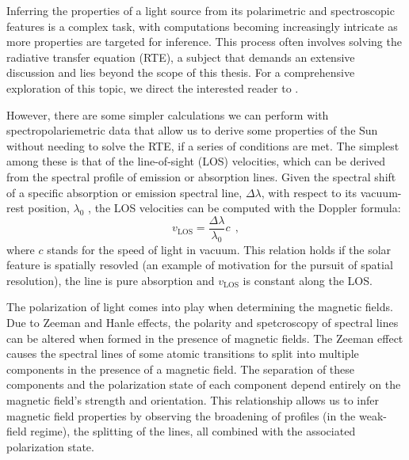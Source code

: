 Inferring the properties of a light source from its polarimetric and spectroscopic features is a complex task, with computations becoming increasingly intricate as more properties are targeted for inference. This process often involves solving the radiative transfer equation (RTE), a subject that demands an extensive discussion and lies beyond the scope of this thesis. For a comprehensive exploration of this topic, we direct the interested reader to \cite{del2016inversion}.

However, there are some simpler calculations we can perform with spectropolariemetric data that allow us to derive some properties of the Sun without needing to solve the RTE, if a series of conditions are met. The simplest among these is that of the line-of-sight (LOS) velocities, which can be derived from the spectral profile of emission or absorption lines. Given the spectral shift of a specific absorption or emission spectral line, $\Delta \lambda$, with respect to its vacuum-rest position, $\lambda _ 0$ , the LOS velocities can be computed with the Doppler formula: 
\begin{equation}
  v_{\text{LOS}} = \frac{\Delta \lambda}{\lambda _ 0}c\ \ ,
  \label{eq_spectro: Doppler}
\end{equation}
where $c$ stands for the speed of light in vacuum. This relation holds if the solar feature is spatially resovled (an example of motivation for the pursuit of spatial resolution), the line is pure absorption and $v_{\text{LOS}}$ is constant along the LOS. 

The polarization of light comes into play when determining the magnetic fields. Due to Zeeman and Hanle effects, the polarity and spetcroscopy of spectral lines can be altered when formed in the presence of magnetic fields. The Zeeman effect causes the spectral lines of some atomic transitions to split into multiple components in the presence of a magnetic field. The separation of these components and the polarization state of each component depend entirely on the magnetic field's strength and orientation. This relationship allows us to infer magnetic field properties by observing the broadening of profiles (in the weak-field regime), the splitting of the lines, all combined with the associated polarization state.

